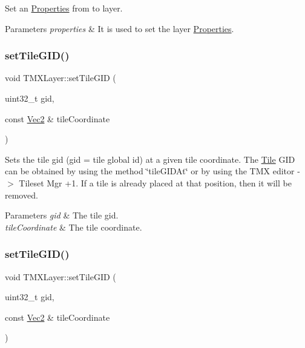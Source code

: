 Set an \hyperlink{classProperties}{Properties} from to layer.


\begin{DoxyParams}{Parameters}
{\em properties} & It is used to set the layer \hyperlink{classProperties}{Properties}. \\
\hline
\end{DoxyParams}
\mbox{\label{classTMXLayer_a6da5cb4f6fa4c0f1853f5030323dd759}} 
\subsubsection{\texorpdfstring{set\+Tile\+G\+I\+D()}{setTileGID()}\hspace{0.1cm}{\footnotesize\ttfamily [1/4]}}
{\footnotesize\ttfamily void T\+M\+X\+Layer\+::set\+Tile\+G\+ID (\begin{DoxyParamCaption}\item[{uint32\+\_\+t}]{gid,  }\item[{const \hyperlink{classVec2}{Vec2} \&}]{tile\+Coordinate }\end{DoxyParamCaption})}

Sets the tile gid (gid = tile global id) at a given tile coordinate. The \hyperlink{structTile}{Tile} G\+ID can be obtained by using the method \char`\"{}tile\+G\+I\+D\+At\char`\"{} or by using the T\+MX editor -\/$>$ Tileset Mgr +1. If a tile is already placed at that position, then it will be removed.


\begin{DoxyParams}{Parameters}
{\em gid} & The tile gid. \\
\hline
{\em tile\+Coordinate} & The tile coordinate. \\
\hline
\end{DoxyParams}
\mbox{\label{classTMXLayer_a6da5cb4f6fa4c0f1853f5030323dd759}} 
\subsubsection{\texorpdfstring{set\+Tile\+G\+I\+D()}{setTileGID()}\hspace{0.1cm}{\footnotesize\ttfamily [2/4]}}
{\footnotesize\ttfamily void T\+M\+X\+Layer\+::set\+Tile\+G\+ID (\begin{DoxyParamCaption}\item[{uint32\+\_\+t}]{gid,  }\item[{const \hyperlink{classVec2}{Vec2} \&}]{tile\+Coordinate }\end{DoxyParamCaption})}

